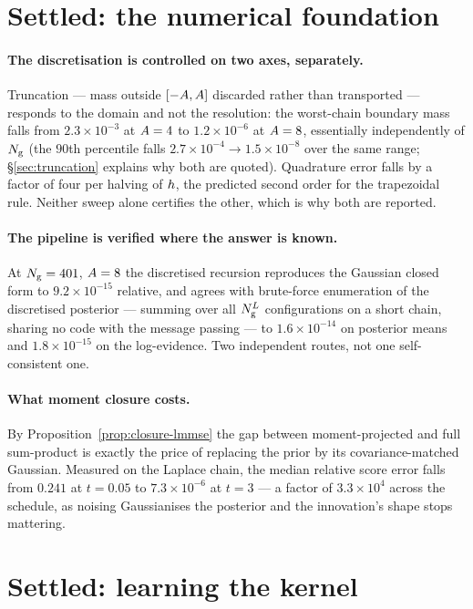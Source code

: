 \section{Settled: the numerical foundation}
\label{sec:rec-rung0}

\paragraph{The discretisation is controlled on two axes, separately.} Truncation --- mass outside
$[-A,A]$ discarded rather than transported --- responds to the domain and not
the resolution: the worst-chain boundary mass falls from $2.3\times10^{-3}$ at $A=4$ to
$1.2\times10^{-6}$ at $A=8$, essentially independently of $N_{\mathrm{g}}$ (the $90$th percentile
falls $2.7\times10^{-4}\to1.5\times10^{-8}$ over the same range; \S\ref{sec:truncation} explains
why both are quoted). Quadrature error falls by a factor of
four per halving of $h$, the predicted second order for the trapezoidal rule. Neither sweep
alone certifies the other, which is why both are reported.

\paragraph{The pipeline is verified where the answer is known.} At $N_{\mathrm{g}}=401$, $A=8$
the discretised recursion reproduces the Gaussian closed form to $9.2\times10^{-15}$ relative,
and agrees with brute-force enumeration of the discretised posterior --- summing over all
$N_{\mathrm{g}}^{L}$ configurations on a short chain, sharing no code with the message passing ---
to $1.6\times10^{-14}$ on posterior means and $1.8\times10^{-15}$ on the log-evidence. Two
independent routes, not one self-consistent one.

\paragraph{What moment closure costs.} By Proposition~\ref{prop:closure-lmmse} the gap between
moment-projected and full sum-product is exactly the price of replacing the prior by its
covariance-matched Gaussian. Measured on the Laplace chain, the median relative score error falls
from $0.241$ at $t=0.05$ to $7.3\times10^{-6}$ at $t=3$ --- a factor of $3.3\times10^{4}$ across
the schedule, as noising Gaussianises the posterior and the innovation's shape stops mattering.

\section{Settled: learning the kernel}
\label{sec:rec-rung1}

